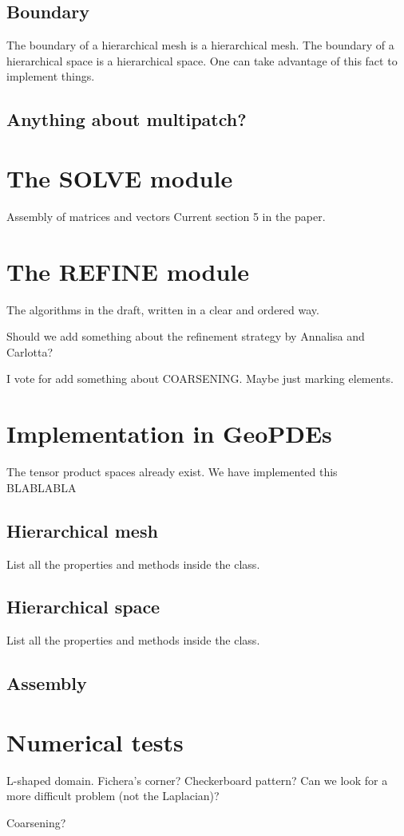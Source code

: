 \documentclass[a4paper]{siamltex1213}
\newcommand{\Rd}{\color{red}}
\begin{document}
\subsection{Boundary}
The boundary of a hierarchical mesh is a hierarchical mesh. The boundary of a hierarchical space is  a hierarchical space. One can take advantage of this fact to implement things.

\subsection{{\Rd Anything about multipatch?}}

\section{The SOLVE module}
Assembly of matrices and vectors
Current section 5 in the paper.

\section{The REFINE module}
The algorithms in the draft, written in a clear and ordered way.

Should we add something about the refinement strategy by Annalisa and Carlotta?

{\Rd I vote for add something about COARSENING. Maybe just marking elements.}

\section{Implementation in GeoPDEs}
The tensor product spaces already exist. We have implemented this BLABLABLA
\subsection{Hierarchical mesh}
List all the properties and methods inside the class.
\subsection{Hierarchical space}
List all the properties and methods inside the class.
\subsection{Assembly}

\section{Numerical tests}
L-shaped domain. Fichera's corner? Checkerboard pattern? Can we look for a more difficult problem (not the Laplacian)?

Coarsening?
\end{document}
